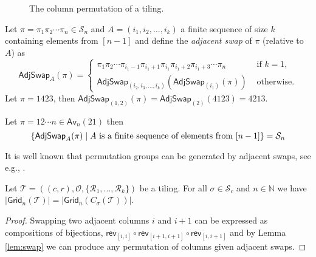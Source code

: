 \begin{figure}[!htbp]
    \centering
    
    \caption{The column permutation of a tiling.}
    \label{fig:t_col_perm}
\end{figure}

Let $\pi=\pi_1\pi_2 \dotsm \pi_n \in\mathcal{S}_n$ and $A = (i_1, i_2,\dotsc,i_k)$ a finite sequence of size $k$ containing elements from $[n-1]$ and define the \emph{adjacent swap} of $\pi$ (relative to $A$) as
\[
\textsf{AdjSwap}_{A}(\pi) = \begin{cases}
\pi_1\pi_2 \dotsm \pi_{i_1-1}\pi_{i_1+1}\pi_{i_1}\pi_{i_1+2}\pi_{i_1+3} \dotsm \pi_n & \mbox{ if } k = 1,\\
\textsf{AdjSwap}_{(i_2,i_3,\dotsc,i_k)}\left(\textsf{AdjSwap}_{(i_1)}(\pi)\right) & \mbox{ otherwise.}
\end{cases}
\]
Let $\pi = 1423$, then $\textsf{AdjSwap}_{(1,2)}(\pi) = \textsf{AdjSwap}_{(2)}(4123) = 4213$.

\begin{lemma}\label{lem:swap}
Let $\pi = 12\dotsm n \in \textsf{Av}_n(21)$ then
\[
    \left\{\textsf{AdjSwap}_A(\pi) \mid A \text{ is a finite sequence of elements from } [n-1]\right\} = \mathcal{S}_n
\]
\end{lemma}
It is well known that permutation groups can be generated by adjacent swaps, see e.g., \cite{adjacentperm}.

\begin{comment}\begin{proof}
Suppose we can generate $\mathcal{S}_{n-1}$ this way from the permutation in $\textsf{Av}_{n-1}(21)$ and let $\pi = \pi_1 \pi_2 \dotsm \pi_n \in \mathcal{S}_n$ with $\pi_j = n$. Let $A = (i_1,i_2,\dotsc,i_k)$ be the sequence of swaps that turns $12\dotsm (n-1)$ into $\pi_1 \pi_2 \dotsm \pi_{j-1}\pi_{j+1}\dotsm \pi_n \in \mathcal{S}_{n-1}$, then
\begin{align*}
    \textsf{AdjSwap}_{(i_1,i_2,\dotsc,i_k, n-1, n-2,\dotsc,j)}(12\dotsm n) = \pi
\end{align*}
and since this holds for a base case, it holds for all sizes $n\in\N$.
\end{proof}\end{comment}

\begin{proposition}
Let $\mathcal{T} = ((c,r),\mathcal{O},\{\mathcal{R}_1,\dotsc,\mathcal{R}_k\})$ be a tiling. For all $\sigma\in\mathcal{S}_c$ and $n\in\mathbb{N}$ we have $|\textsf{Grid}_n(\mathcal{T})| = |\textsf{Grid}_n\left(C_\sigma(\mathcal{T})\right)|$.
\end{proposition}
\begin{proof}
Swapping two adjacent columns $i$ and $i+1$ can be expressed as compositions of bijections, $\textsf{rev}_{[i,i]} \circ \textsf{rev}_{[i+1,i+1]} \circ \textsf{rev}_{[i,i+1]}$ and by Lemma \ref{lem:swap} we can produce any permutation of columns given adjacent swaps.
\end{proof}
